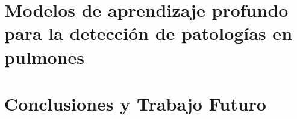 \documentclass[12pt, oneside]{book}
\begin{document}
\chapter{Modelos de aprendizaje profundo para la detección de patologías en pulmones }


\chapter{Conclusiones y Trabajo Futuro}

\appendix


% 

% 





\end{document}
